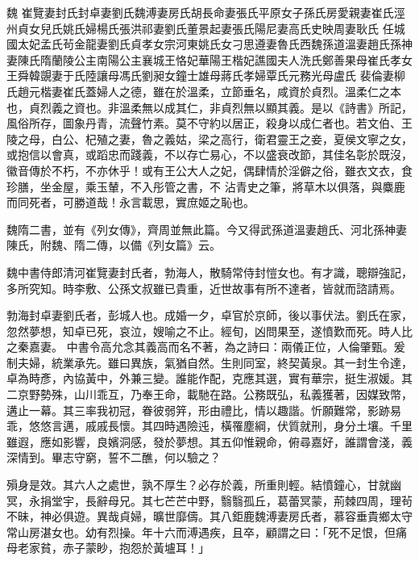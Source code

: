 
\begin{pinyinscope}

 魏
 崔覽妻封氏封卓妻劉氏魏溥妻房氏胡長命妻張氏平原女子孫氏房愛親妻崔氏涇州貞女兒氏姚氏婦楊氏張洪祁妻劉氏董景起妻張氏陽尼妻高氏史映周妻耿氏
 任城國太妃孟氏茍金龍妻劉氏貞孝女宗河東姚氏女刁思遵妻魯氏西魏孫道溫妻趙氏孫神妻陳氏隋蘭陵公主南陽公主襄城王恪妃華陽王楷妃譙國夫人洗氏鄭善果母崔氏孝女王舜韓覬妻于氏陸讓母馮氏劉昶女鐘士雄母蔣氏孝婦覃氏元務光母盧氏
 裴倫妻柳氏趙元楷妻崔氏蓋婦人之德，雖在於溫柔，立節垂名，咸資於貞烈。溫柔仁之本也，貞烈義之資也。非溫柔無以成其仁，非貞烈無以顯其義。是以《詩書》所記，風俗所存，圖象丹青，流聲竹素。莫不守約以居正，殺身以成仁者也。若文伯、王陵之母，白公、杞殖之妻，魯之義姑，梁之高行，衛君靈王之妾，夏侯文寧之女，或抱信以會真，或蹈忠而踐義，不以存亡易心，不以盛衰改節，其佳名彰於既沒，徽音傳於不朽，不亦休乎！或有王公大人之妃，偶肆情於淫僻之俗，雖衣文衣，食珍膳，坐金屋，乘玉輦，不入彤管之書，不
 沾青史之筆，將草木以俱落，與麋鹿而同死者，可勝道哉！永言載思，實庶姬之恥也。



 魏隋二書，並有《列女傳》，齊周並無此篇。今又得武孫道溫妻趙氏、河北孫神妻陳氏，附魏、隋二傳，以備《列女篇》云。



 魏中書侍郎清河崔覽妻封氏者，勃海人，散騎常侍封愷女也。有才識，聰辯強記，多所究知。時李敷、公孫文叔雖已貴重，近世故事有所不達者，皆就而諮請焉。



 勃海封卓妻劉氏者，彭城人也。成婚一夕，卓官於京師，後以事伏法。劉氏在家，忽然夢想，知卓已死，哀泣，嫂喻之不止。經旬，凶問果至，遂憤歎而死。時人比之秦嘉妻。
 中書令高允念其義高而名不著，為之詩曰：兩儀正位，人倫肇甄。爰制夫婦，統業承先。雖曰異族，氣猶自然。生則同室，終契黃泉。其一封生令達，卓為時彥，內協黃中，外兼三變。誰能作配，克應其選，實有華宗，挺生淑媛。其二京野勢殊，山川乖互，乃奉王命，載馳在路。公務既弘，私義獲著，因媒致幣，遘止一幕。其三率我初冠，眷彼弱笄，形由禮比，情以趣諧。忻願難常，影跡易乖，悠悠言邁，戚戚長懷。其四時遇險迍，橫罹塵綱，伏質就刑，身分土壤。千里雖遐，應如影響，良嬪洞感，發於夢想。其五仰惟親命，俯尋嘉好，誰謂會淺，義深情到。畢志守窮，誓不二醮，何以驗之？



 殞身是效。其六人之處世，孰不厚生？必存於義，所重則輕。結憤鐘心，甘就幽冥，永捐堂宇，長辭母兄。其七芒芒中野，翳翳孤丘，葛蕾冥蒙，荊棘四周，理茍不昧，神必俱遊。異哉貞婦，曠世靡儔。其八鉅鹿魏溥妻房氏者，慕容垂貴鄉太守常山房湛女也。幼有烈操。年十六而溥遇疾，且卒，顧謂之曰：「死不足恨，但痛母老家貧，赤子蒙眇，抱怨於黃壚耳！」




\end{pinyinscope}
